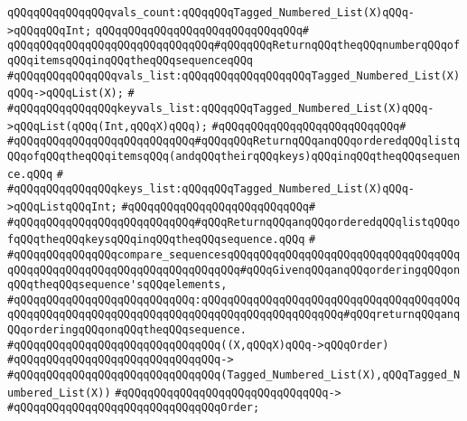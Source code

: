 \newline
\verb|qQQqqQQqqQQqqQQqvals_count:qQQqqQQqTagged_Numbered_List(X)qQQq->qQQqqQQqInt;|\newline
\verb|qQQqqQQqqQQqqQQqqQQqqQQqqQQqqQQq#|\newline
\verb|qQQqqQQqqQQqqQQqqQQqqQQqqQQqqQQq#qQQqqQQqReturnqQQqtheqQQqnumberqQQqofqQQqitemsqQQqinqQQqtheqQQqsequenceqQQq|\newline
\newline
\verb|#qQQqqQQqqQQqqQQqvals_list:qQQqqQQqqQQqqQQqqQQqTagged_Numbered_List(X)qQQq->qQQqList(X);|\newline
\verb|#|\newline
\verb|#qQQqqQQqqQQqqQQqkeyvals_list:qQQqqQQqTagged_Numbered_List(X)qQQq->qQQqList(qQQq(Int,qQQqX)qQQq);|\newline
\verb|#qQQqqQQqqQQqqQQqqQQqqQQqqQQq#|\newline
\verb|#qQQqqQQqqQQqqQQqqQQqqQQqqQQq#qQQqqQQqReturnqQQqanqQQqorderedqQQqlistqQQqofqQQqtheqQQqitemsqQQq(andqQQqtheirqQQqkeys)qQQqinqQQqtheqQQqsequence.qQQq|\newline
\verb|#|\newline
\verb|#qQQqqQQqqQQqqQQqkeys_list:qQQqqQQqTagged_Numbered_List(X)qQQq->qQQqListqQQqInt;|\newline
\verb|#qQQqqQQqqQQqqQQqqQQqqQQqqQQq#|\newline
\verb|#qQQqqQQqqQQqqQQqqQQqqQQqqQQq#qQQqReturnqQQqanqQQqorderedqQQqlistqQQqofqQQqtheqQQqkeysqQQqinqQQqtheqQQqsequence.qQQq|\newline
\verb|#|\newline
\verb|#qQQqqQQqqQQqqQQqcompare_sequencesqQQqqQQqqQQqqQQqqQQqqQQqqQQqqQQqqQQqqQQqqQQqqQQqqQQqqQQqqQQqqQQqqQQqqQQq#qQQqGivenqQQqanqQQqorderingqQQqonqQQqtheqQQqsequence'sqQQqelements,|\newline
\verb|#qQQqqQQqqQQqqQQqqQQqqQQqqQQq:qQQqqQQqqQQqqQQqqQQqqQQqqQQqqQQqqQQqqQQqqQQqqQQqqQQqqQQqqQQqqQQqqQQqqQQqqQQqqQQqqQQqqQQqqQQq#qQQqreturnqQQqanqQQqorderingqQQqonqQQqtheqQQqsequence.|\newline
\verb|#qQQqqQQqqQQqqQQqqQQqqQQqqQQqqQQq((X,qQQqX)qQQq->qQQqOrder)|\newline
\verb|#qQQqqQQqqQQqqQQqqQQqqQQqqQQqqQQq->|\newline
\verb|#qQQqqQQqqQQqqQQqqQQqqQQqqQQqqQQq(Tagged_Numbered_List(X),qQQqTagged_Numbered_List(X))|\newline
\verb|#qQQqqQQqqQQqqQQqqQQqqQQqqQQqqQQq->|\newline
\verb|#qQQqqQQqqQQqqQQqqQQqqQQqqQQqqQQqOrder;|\newline

